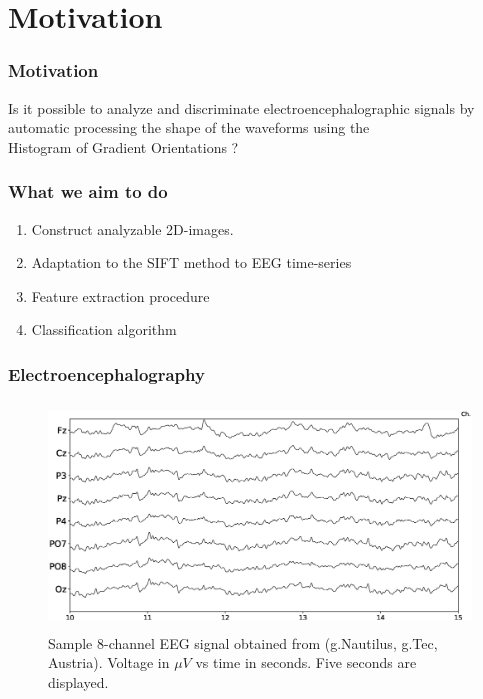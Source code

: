 \documentclass[aspectratio=169]{beamer}
\newcommand\Fontre{\fontsize{16}{16.2}\selectfont}
\begin{document}
    \section{Motivation}
    \begin{frame}
        \frametitle{Motivation}
        \begin{center}
                \LARGE Is it possible to analyze and discriminate electroencephalographic signals by automatic processing the shape of the waveforms using the \\ Histogram of Gradient Orientations ?
        \end{center}
    \end{frame}
    \begin{frame}
    
\frametitle{What we aim to do}
\begin{center}
\begin{enumerate}
\item<1-> \Fontre Construct analyzable 2D-images.
\item<2-> \Fontre Adaptation to the SIFT method to EEG time-series
\item<3-> \Fontre Feature extraction procedure
\item<4-> \Fontre Classification algorithm
\end{enumerate}
\end{center}
\end{frame}
    
\begin{frame}
\frametitle{Electroencephalography}
\begin{center}
\begin{figure}[]
\centering
\includegraphics[height=6.0cm,width=14cm]{images/sampleeeg.eps}
\caption{Sample 8-channel EEG signal obtained from (g.Nautilus, g.Tec, Austria). Voltage in $\mu V$ vs time in seconds. Five seconds are displayed.}
\label{fig:sampleeeg}
\end{figure}
\end{center}
\end{frame}
\end{document}
